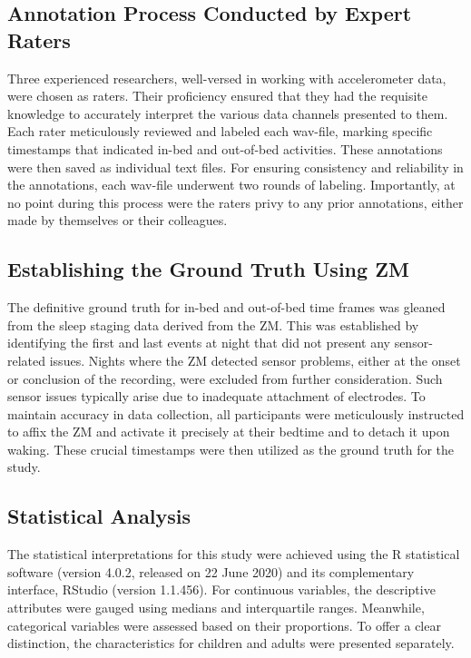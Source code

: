 \documentclass[
  10pt,
]{scrbook}
\begin{document}
\hypertarget{annotation-process-conducted-by-expert-raters}{%
\subsection{Annotation Process Conducted by Expert
Raters}\label{annotation-process-conducted-by-expert-raters}}

Three experienced researchers, well-versed in working with accelerometer
data, were chosen as raters. Their proficiency ensured that they had the
requisite knowledge to accurately interpret the various data channels
presented to them. Each rater meticulously reviewed and labeled each
wav-file, marking specific timestamps that indicated in-bed and
out-of-bed activities. These annotations were then saved as individual
text files. For ensuring consistency and reliability in the annotations,
each wav-file underwent two rounds of labeling. Importantly, at no point
during this process were the raters privy to any prior annotations,
either made by themselves or their colleagues.

\hypertarget{establishing-the-ground-truth-using-zm}{%
\subsection{Establishing the Ground Truth Using
ZM}\label{establishing-the-ground-truth-using-zm}}

The definitive ground truth for in-bed and out-of-bed time frames was
gleaned from the sleep staging data derived from the ZM. This was
established by identifying the first and last events at night that did
not present any sensor-related issues. Nights where the ZM detected
sensor problems, either at the onset or conclusion of the recording,
were excluded from further consideration. Such sensor issues typically
arise due to inadequate attachment of electrodes. To maintain accuracy
in data collection, all participants were meticulously instructed to
affix the ZM and activate it precisely at their bedtime and to detach it
upon waking. These crucial timestamps were then utilized as the ground
truth for the study.

\hypertarget{statistical-analysis}{%
\subsection{Statistical Analysis}\label{statistical-analysis}}

The statistical interpretations for this study were achieved using the R
statistical software (version 4.0.2, released on 22 June 2020) and its
complementary interface, RStudio (version 1.1.456). For continuous
variables, the descriptive attributes were gauged using medians and
interquartile ranges. Meanwhile, categorical variables were assessed
based on their proportions. To offer a clear distinction, the
characteristics for children and adults were presented separately.
\end{document}
